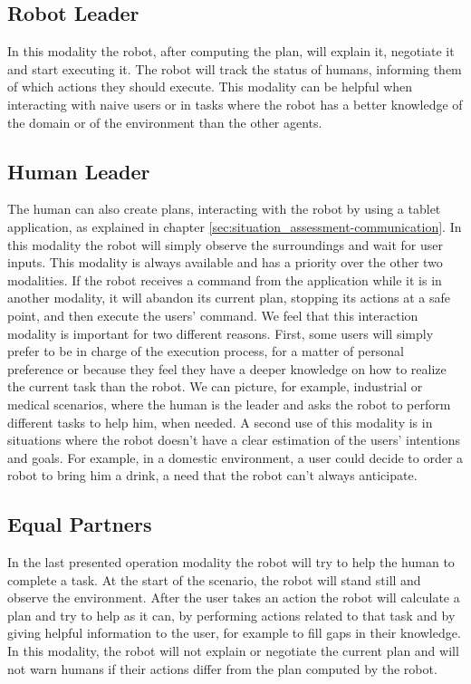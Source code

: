 \subsection{Robot Leader}
In this modality the robot, after computing the plan, will explain it, negotiate it and start executing it.
The robot will track the status of humans, informing them of which actions they should execute. This modality can be helpful when interacting with  naive users or in tasks where the robot has a better knowledge of the
domain or of the environment than the other agents.

\subsection{Human Leader}
The human can also create plans, interacting with the robot by using a
tablet application, as explained in chapter \ref{sec:situation_assessment-communication}. In this modality the robot   
will simply observe the surroundings and wait for user inputs. This modality is always available and has a priority over
the other two modalities. If the robot receives a command from the
application while it is in another modality, it will abandon its current
plan, stopping its actions at a safe point, and then execute the users'
command. We feel that this interaction modality is important for two
different reasons.  First, some users will simply prefer to be in
charge of the execution process, for a matter of personal preference or because they
feel they have a deeper knowledge on how to realize the current task
than the robot. We can picture, for example, industrial or medical
scenarios, where the human is the leader and asks the robot to perform
different tasks to help him, when needed. A second use of this modality is in situations where
the robot doesn't have  a clear estimation of the users' intentions and
goals. For example, in a domestic environment, a user could decide to
order a robot to bring him a drink, a need that the robot can't always anticipate.

\subsection{Equal Partners}
In the last presented operation modality the robot will try to help
the human to complete a task. At the start of the scenario, the robot
will stand still and observe the environment. After the user takes an
action the robot will calculate a plan and try to help as it can, by
performing actions related to that task and by giving helpful information to
the user, for example to fill gaps in their knowledge. In this modality, 
the robot will not explain or negotiate the current plan and will not warn humans if
their actions differ from the plan computed by the robot.

